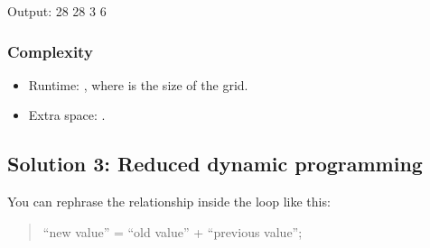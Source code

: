 \documentclass[letterpaper,12pt,english]{book}
\begin{document}
\begin{sphinxVerbatim}[commandchars=\\\{\}]
\end{sphinxVerbatim}

\begin{sphinxVerbatim}[commandchars=\\\{\}]
Output:
28
28
3
6
\end{sphinxVerbatim}


\subsubsection{Complexity}
\label{\detokenize{Dynamic_Programming/05_DP_62_Unique_Paths:id2}}\begin{itemize}
\item {} 
\sphinxAtStartPar
Runtime: , where  is the size of the grid.

\item {} 
\sphinxAtStartPar
Extra space: .

\end{itemize}


\subsection{Solution 3: Reduced dynamic programming}
\label{\detokenize{Dynamic_Programming/05_DP_62_Unique_Paths:solution-3-reduced-dynamic-programming}}
\sphinxAtStartPar
You can rephrase the relationship inside the loop like this:
\begin{quote}

\sphinxAtStartPar
“new value” = “old value” + “previous value”;
\end{quote}
\end{document}
